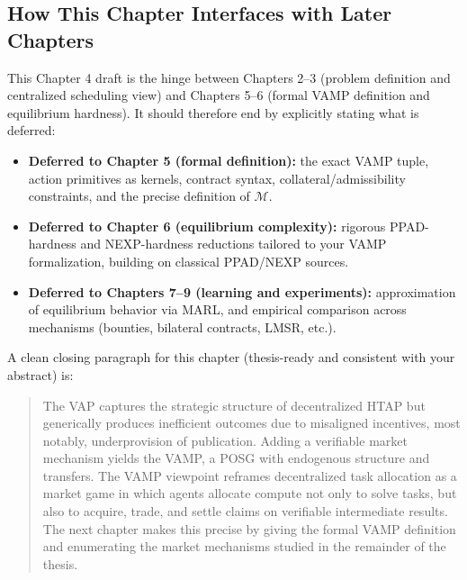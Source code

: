 \subsection{How This Chapter Interfaces with Later Chapters}

This Chapter 4 draft is the hinge between Chapters 2--3 (problem definition and centralized scheduling view) and Chapters 5--6 (formal VAMP definition and equilibrium hardness). It should therefore end by explicitly stating what is deferred:

\begin{itemize}
\item \textbf{Deferred to Chapter 5 (formal definition):} the exact VAMP tuple, action primitives as kernels, contract syntax, collateral/admissibility constraints, and the precise definition of \(\mathcal{M}\).
\item \textbf{Deferred to Chapter 6 (equilibrium complexity):} rigorous PPAD-hardness and NEXP-hardness reductions tailored to your VAMP formalization, building on classical PPAD/NEXP sources.
\item \textbf{Deferred to Chapters 7--9 (learning and experiments):} approximation of equilibrium behavior via MARL, and empirical comparison across mechanisms (bounties, bilateral contracts, LMSR, etc.).
\end{itemize}

A clean closing paragraph for this chapter (thesis-ready and consistent with your abstract) is:

\begin{quote}
The VAP captures the strategic structure of decentralized HTAP but generically produces inefficient outcomes due to misaligned incentives, most notably, underprovision of publication. Adding a verifiable market mechanism yields the VAMP, a POSG with endogenous structure and transfers. The VAMP viewpoint reframes decentralized task allocation as a market game in which agents allocate compute not only to solve tasks, but also to acquire, trade, and settle claims on verifiable intermediate results. The next chapter makes this precise by giving the formal VAMP definition and enumerating the market mechanisms studied in the remainder of the thesis.
\end{quote}
